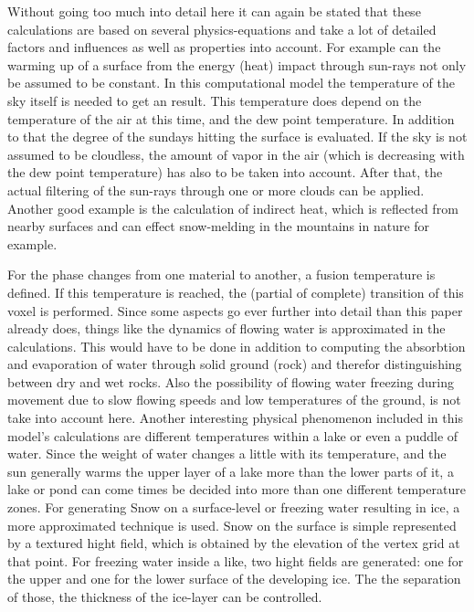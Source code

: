 Without going too much into detail here it can again be stated that these calculations are based on several physics-equations and take a lot of detailed factors and influences as well as properties into account. For example can the warming up of a surface from the energy (heat) impact through sun-rays not only be assumed to be constant. In this computational model the temperature of the sky itself is needed to get an result. This temperature does depend on the temperature of the air at this time, and the dew point temperature. In addition to that the degree of the sundays hitting the surface is evaluated. If the sky is not assumed to be cloudless, the amount of vapor in the air (which is decreasing with the dew point temperature) has also to be taken into account. After that, the actual filtering of the sun-rays through one or more clouds can be applied. Another good example is the calculation of indirect heat, which is reflected from nearby surfaces and can effect snow-melding in the mountains in nature for example.

For the phase changes from one material to another, a fusion temperature is defined. If this temperature is reached, the (partial of complete) transition of this voxel is performed. Since some aspects go ever further into detail than this paper already does, things like the dynamics of flowing water is approximated in the calculations. This would have to be done in addition to computing the absorbtion and evaporation of water through solid ground (rock) and therefor distinguishing between dry and wet rocks. Also the possibility of flowing water freezing during movement due to slow flowing speeds and low temperatures of the ground, is not take into account here. Another interesting physical phenomenon included in this model’s calculations are different temperatures within a lake or even a puddle of water. Since the weight of water changes a little with its temperature, and the sun generally warms the upper layer of a lake more than the lower parts of it, a lake or pond can come times be decided into more than one different temperature zones.
For generating Snow on a surface-level or freezing water resulting in ice, a more approximated technique is used. Snow on the surface is simple represented by a textured hight field, which is obtained by the elevation of the vertex grid at that point. For freezing water inside a like, two hight fields are generated: one for the upper and one for the lower surface of the developing ice. The the separation of those, the thickness of the ice-layer can be controlled.

